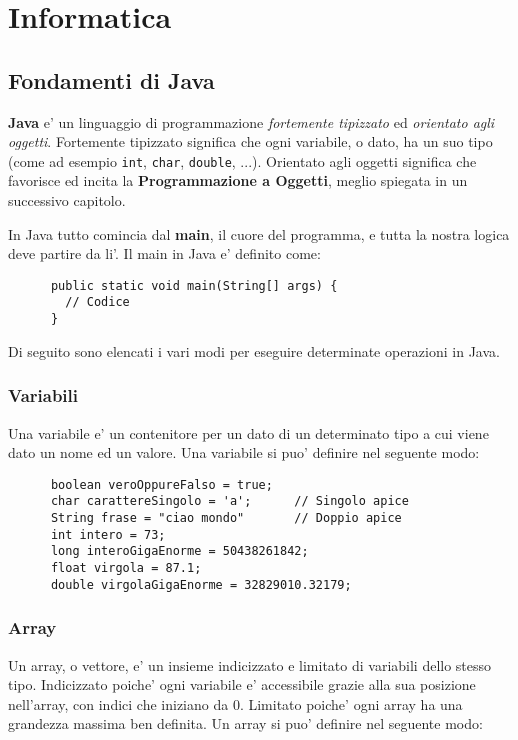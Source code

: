 \documentclass{article}
\begin{document}
  \newpage
  \tableofcontents
  \newpage

  \section{Informatica}
  {
    \subsection{Fondamenti di Java}
    \textbf{Java} e' un linguaggio di programmazione \textit{fortemente tipizzato} ed \textit{orientato agli oggetti}. Fortemente tipizzato significa che ogni variabile, o dato, ha un suo tipo \small{(come ad esempio \texttt{int}, \texttt{char}, \texttt{double}, ...)}. Orientato agli oggetti significa che favorisce ed incita la \textbf{Programmazione a Oggetti}, meglio spiegata in un successivo capitolo.

    In Java tutto comincia dal \textbf{main}, il cuore del programma, e tutta la nostra logica deve partire da li'. Il main in Java e' definito come:

    \begin{verbatim}
      public static void main(String[] args) {
        // Codice
      }
    \end{verbatim}

    Di seguito sono elencati i vari modi per eseguire determinate operazioni in Java.

    \subsubsection{Variabili}
    Una variabile e' un contenitore per un dato di un determinato tipo a cui viene dato un nome ed un valore. Una variabile si puo' definire nel seguente modo:

    \begin{verbatim}
      boolean veroOppureFalso = true;
      char carattereSingolo = 'a';      // Singolo apice
      String frase = "ciao mondo"       // Doppio apice
      int intero = 73;
      long interoGigaEnorme = 50438261842;
      float virgola = 87.1;
      double virgolaGigaEnorme = 32829010.32179;
    \end{verbatim}

    \subsubsection{Array}
    Un array, o vettore, e' un insieme indicizzato e limitato di variabili dello stesso tipo. Indicizzato poiche' ogni variabile e' accessibile grazie alla sua posizione nell'array, con indici che iniziano da 0. Limitato poiche' ogni array ha una grandezza massima ben definita. Un array si puo' definire nel seguente modo:

}
\end{document}
